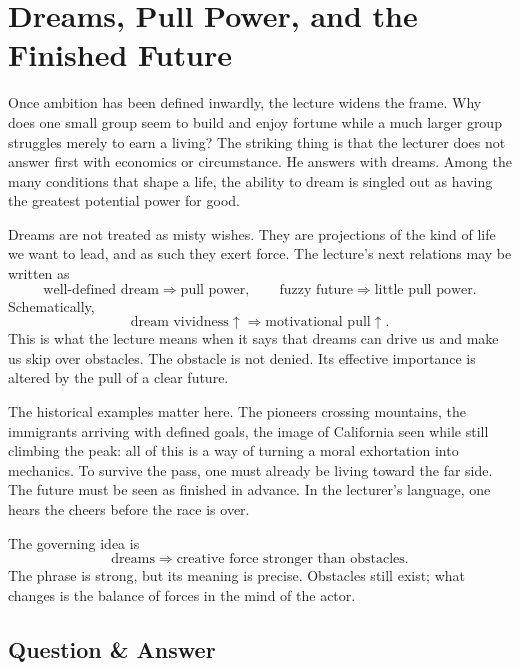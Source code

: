 \section{Dreams, Pull Power, and the Finished Future}

Once ambition has been defined inwardly, the lecture widens the frame. Why does one small group seem to build and enjoy fortune while a much larger group struggles merely to earn a living? The striking thing is that the lecturer does not answer first with economics or circumstance. He answers with dreams. Among the many conditions that shape a life, the ability to dream is singled out as having the greatest potential power for good.

Dreams are not treated as misty wishes. They are projections of the kind of life we want to lead, and as such they exert force. The lecture's next relations may be written as
\begin{equation}
\text{well-defined dream}\Rightarrow \text{pull power},
\qquad
\text{fuzzy future}\Rightarrow \text{little pull power}.
\end{equation}
Schematically,
\begin{equation}
\text{dream vividness}\uparrow \Rightarrow \text{motivational pull}\uparrow.
\end{equation}
This is what the lecture means when it says that dreams can drive us and make us skip over obstacles. The obstacle is not denied. Its effective importance is altered by the pull of a clear future.

The historical examples matter here. The pioneers crossing mountains, the immigrants arriving with defined goals, the image of California seen while still climbing the peak: all of this is a way of turning a moral exhortation into mechanics. To survive the pass, one must already be living toward the far side. The future must be seen as finished in advance. In the lecturer's language, one hears the cheers before the race is over.

The governing idea is
\begin{equation}
\text{dreams} \Rightarrow \text{creative force stronger than obstacles}.
\end{equation}
The phrase is strong, but its meaning is precise. Obstacles still exist; what changes is the balance of forces in the mind of the actor.

\subsection{Question \& Answer}

